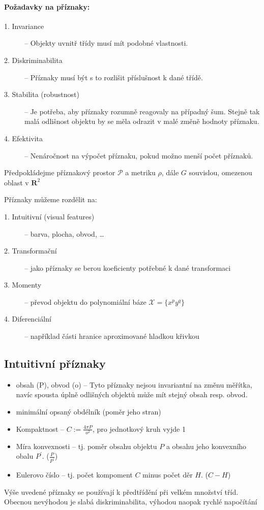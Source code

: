 \paragraph{Požadavky na příznaky:}
\begin{description}
\item[1. Invariance] -- Objekty uvnitř třídy musí mít podobné vlastnosti.
\item[2. Diskriminabilita] -- Příznaky musí být s to rozlišit příslušnost k dané třídě.
\item[3. Stabilita (robustnost)] -- Je potřeba, aby příznaky rozumně reagovaly na případný šum. Stejně tak malá odlišnost
objektu by se měla odrazit v malé změně hodnoty příznaku.
\item[4. Efektivita] -- Nenáročnost na výpočet příznaku, pokud možno menší počet příznaků.
\end{description}

\def\R{\mathbf{R}}
Předpokládejme příznakový prostor $\mathcal{P}$ a metriku $\rho$, dále $G$ souvislou, omezenou oblast v $\R^2$

Příznaky můžeme rozdělit na:
\begin{description}
\item[1. Intuitivní (visual features)] -- barva, plocha, obvod, \dots
\item[2. Transformační] -- jako příznaky se berou koeficienty potřebné k dané transformaci
\item[3. Momenty ] -- převod objektu do polynomiální báze $\mathcal{X}=\{x^py^q\}$
\item[4. Diferenciální] -- například části hranice aproximované hladkou křivkou
\end{description}

\subsection{Intuitivní příznaky}
\begin{itemize}
\item obsah (P), obvod (o) -- Tyto příznaky nejsou invariantní na změnu měřítka,
navíc spousta úplně odlišných objektů může mít stejný obsah resp. obvod.
\item minimální opsaný obdélník (poměr jeho stran)
\item Kompaktnost -- $C:=\frac{4\pi P}{o^2}$, pro jednotkový kruh vyjde 1
\item Míra konvexnosti -- tj. poměr obsahu objektu $P$ a obsahu jeho konvexního obalu $P^\prime$. ($\frac{P}{P^\prime}$)
\item Eulerovo číslo -- tj. počet kompoment $C$ minus počet děr $H$. ($C-H$)
\end{itemize}
Výše uvedené příznaky se používají k předtřídění při velkém množství tříd. Obecnou nevýhodou je slabá diskriminabilita,
výhodou naopak rychlé napočítání

